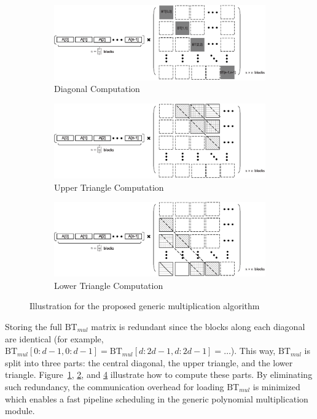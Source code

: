 \documentclass[runningheads]{llncs}
\begin{document}
\begin{figure}[!tb]
\centering
\begin{subfigure}[t]{0.47\textwidth}\centering
\includegraphics[width=\textwidth]{./fig/generic_mul_illustrate.eps}
\caption{Diagonal Computation}
\label{fig:gmul_ill1}
\end{subfigure}
\hspace{1em}
\begin{subfigure}[t]{0.47\textwidth}\centering
\includegraphics[width=\textwidth]{./fig/generic_mul_illustrate2.eps}
\caption{Upper Triangle Computation}
\label{fig:gmul_ill2}
\end{subfigure}
\hspace{1em}
\begin{subfigure}[t]{0.47\textwidth}\centering
\includegraphics[width=\textwidth]{./fig/generic_mul_illustrate3.eps}
\caption{Lower Triangle Computation}
\label{fig:gmul_ill3}
\end{subfigure}
\caption{Illustration for the proposed generic multiplication algorithm}
\end{figure}
Storing the full $\text{BT}_{mul}$ matrix is redundant
since the blocks along each diagonal are identical
(for example, $\text{BT}_{mul}[0:d-1,0:d-1] = \text{BT}_{mul}[d:2d-1,d:2d-1] = \ldots$).
This way, $\text{BT}_{mul}$ is split into three parts: the central diagonal, the upper triangle, and the lower triangle. Figure~\ref{fig:gmul_ill1}, \ref{fig:gmul_ill2}, and \ref{fig:gmul_ill3} illustrate how to compute these parts.
By eliminating such redundancy, the communication overhead for
loading $\text{BT}_{mul}$ is minimized which enables a
fast pipeline scheduling in the generic polynomial multiplication module.
\end{document}
